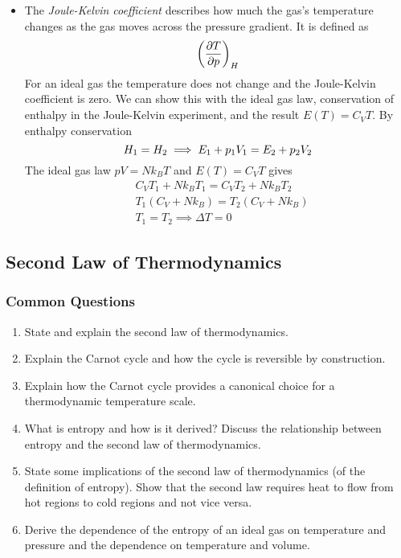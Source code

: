 \documentclass[11pt, a4paper]{article}
\newcommand{\pdveval}[3]{\left(\pdv{#1}{#2}\right)_{#3}}
\begin{document}
\begin{itemize}
	\item The \textit{Joule-Kelvin coefficient} describes how much the gas's temperature changes as the gas moves across the pressure gradient. It is defined as
	\begin{equation*}
		\pdveval{T}{p}{H}
	\end{equation*}
	For an ideal gas the temperature does not change and the Joule-Kelvin coefficient is zero. We can show this with the ideal gas law, conservation of enthalpy in the Joule-Kelvin experiment, and the result $ E(T) = C_{V}T $. By enthalpy conservation
	\begin{equation*}
		H_{1} = H_{2} \implies E_{1} + p_{1}V_{1} = E_{2} + p_{2}V_{2}\\
	\end{equation*}
	The ideal gas law $ pV = Nk_{B}T $ and $ E(T) = C_{V}T $ gives
	\begin{align*}
		&C_{V}T_{1} + Nk_{B}T_{1} = C_{V}T_{2} + Nk_{B}T_{2}\\
		&T_{1}(C_{V} + Nk_{B}) = T_{2}(C_{V} + Nk_{B})\\
		&T_{1} = T_{2} \implies \Delta T = 0
	\end{align*} 
\end{itemize}


\subsection{Second Law of Thermodynamics}

\subsubsection{Common Questions}
\begin{enumerate}
    \item State and explain the second law of thermodynamics.
    
    \item Explain the Carnot cycle and how the cycle is reversible by construction.

    \item Explain how the Carnot cycle provides a canonical choice for a thermodynamic temperature scale.

    \item What is entropy and how is it derived? Discuss the relationship between entropy and the second law of thermodynamics.

    \item State some implications of the second law of thermodynamics (of the definition of entropy). Show that the second law requires heat to flow from hot regions to cold regions and not vice versa.

    \item Derive the dependence of the entropy of an ideal gas on temperature and pressure and the dependence on temperature and volume.

\end{enumerate}
\end{document}
